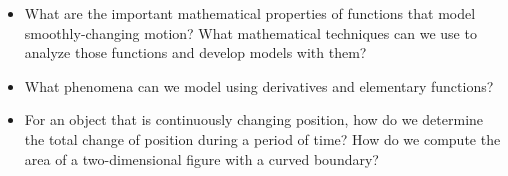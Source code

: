 \documentclass[11pt]{amsart}
\begin{document}
\begin{itemize}
\item What are the important mathematical properties of functions that model smoothly-changing motion? What mathematical techniques can we use to analyze those functions and develop models with them?
\item What phenomena can we model using derivatives and elementary functions?
\item For an object that is continuously changing position, how do we determine the total change of position during a period of time?
        How do we compute the area of a two-dimensional figure with a curved boundary?

\end{itemize}
\end{document}
